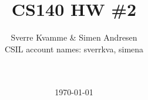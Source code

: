 \newcommand{\figurepath}{./figures/}
\newcommand{\figurescale}{0.6}
\newcommand{\codepath}{../matlab/}




\title{CS140 HW \#2}
\author{Sverre Kvamme \& Simen Andresen\\
CSIL account names: sverrkva, simena}
\date{\ \\ \ \\ \today}




\maketitle


\pagestyle{fancy}
\lhead{}
\rhead{\thepage}
\setcounter{page}{1}

\rhead{\thepage}
\cfoot{}


%



